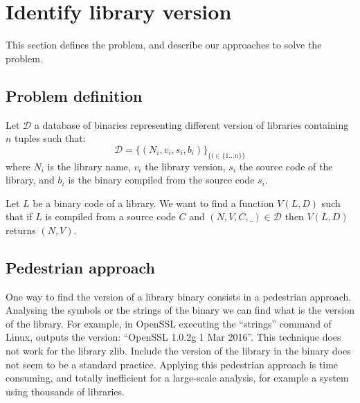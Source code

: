 \documentclass{article}
\begin{document}
   \section{Identify library version}
	This section defines the problem, and describe our approaches to solve the problem.
   \subsection{Problem definition}

   Let $\mathcal{D}$ a database of binaries representing different version of libraries containing $n$ tuples such that:
    \[ \mathcal{D} = \{ (N_i, v_i, s_i, b_i) \}_{\{i \in \{1 \dots n\}\}}  \]
    where $N_i$ is the library name, $v_i$ the library version, $s_i$ the source
    code of the library, and $b_i$ is the binary compiled from the source code $s_i$. 

    Let $L$ be a binary code of a library. We want to find a function $V(L,D)$ such that if $L$ is compiled from a source code $C$ and $(N, V, C, \_) \in \mathcal{D}$ then $V(L,D)$ returns $(N,V)$.

	\subsection{Pedestrian approach}
    
	    One way to find the version of a library binary consists in a pedestrian approach. Analysing the symbols or the strings of the binary we can find what is the version of the library. For example, in OpenSSL executing the ``strings'' command of Linux, outputs the version: ``OpenSSL 1.0.2g  1 Mar 2016''. This technique does not work for the library zlib. Include the version of the library in the binary does not seem to be a standard practice.
	Applying this pedestrian approach is time consuming, and totally inefficient for a large-scale analysis, for example a system using thousands of libraries.
	   
\end{document}
